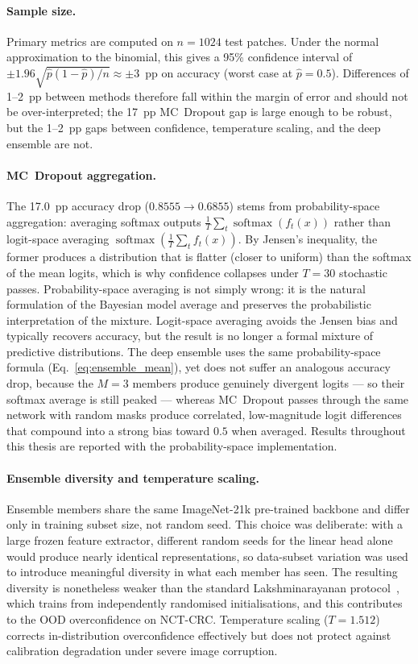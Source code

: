 \paragraph{Sample size.} Primary metrics are computed on $n = 1024$ test patches. Under the normal approximation to the binomial, this gives a 95\% confidence interval of $\pm 1.96\sqrt{\hat{p}(1-\hat{p})/n} \approx \pm 3$~pp on accuracy (worst case at $\hat{p}=0.5$). Differences of 1--2~pp between methods therefore fall within the margin of error and should not be over-interpreted; the 17~pp MC~Dropout gap is large enough to be robust, but the 1--2~pp gaps between confidence, temperature scaling, and the deep ensemble are not.

\paragraph{MC~Dropout aggregation.} The 17.0~pp accuracy drop ($0.8555 \rightarrow 0.6855$) stems from probability-space aggregation: averaging softmax outputs $\frac{1}{T}\sum_t \operatorname{softmax}(f_t(x))$ rather than logit-space averaging $\operatorname{softmax}\!\left(\frac{1}{T}\sum_t f_t(x)\right)$. By Jensen's inequality, the former produces a distribution that is flatter (closer to uniform) than the softmax of the mean logits, which is why confidence collapses under $T=30$ stochastic passes. Probability-space averaging is not simply wrong: it is the natural formulation of the Bayesian model average and preserves the probabilistic interpretation of the mixture. Logit-space averaging avoids the Jensen bias and typically recovers accuracy, but the result is no longer a formal mixture of predictive distributions. The deep ensemble uses the same probability-space formula (Eq.~\ref{eq:ensemble_mean}), yet does not suffer an analogous accuracy drop, because the $M=3$ members produce genuinely divergent logits --- so their softmax average is still peaked --- whereas MC~Dropout passes through the same network with random masks produce correlated, low-magnitude logit differences that compound into a strong bias toward $0.5$ when averaged. Results throughout this thesis are reported with the probability-space implementation.

\paragraph{Ensemble diversity and temperature scaling.} Ensemble members share the same ImageNet-21k pre-trained backbone and differ only in training subset size, not random seed. This choice was deliberate: with a large frozen feature extractor, different random seeds for the linear head alone would produce nearly identical representations, so data-subset variation was used to introduce meaningful diversity in what each member has seen. The resulting diversity is nonetheless weaker than the standard Lakshminarayanan protocol~\cite{lakshminarayanan2017simple}, which trains from independently randomised initialisations, and this contributes to the OOD overconfidence on NCT-CRC. Temperature scaling ($T = 1.512$) corrects in-distribution overconfidence effectively but does not protect against calibration degradation under severe image corruption.

